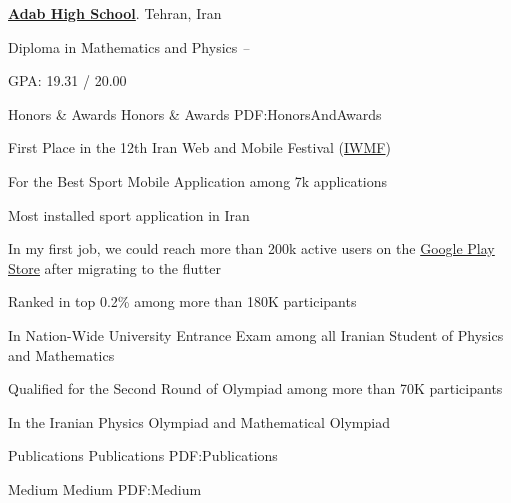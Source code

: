 \documentclass[letterpaper,MMMyyyy,nonstopmode]{resume}
\begin{document}
\begin{Body}
\BigGap
\Entry
\href{http://adab.sch.ir/HSchool}
{\textbf{Adab High School}}.
\small{Tehran, Iran}

\Gap
\BulletItem
Diploma in Mathematics and Physics
\hfill
\textsl{\small{ -- }}
\begin{Detail}
\SubBulletItem
GPA: 19.31 / 20.00
\end{Detail}


\Section
{Honors \&\newline
Awards}
{Honors \& Awards}
{PDF:HonorsAndAwards}

\BulletItem
First Place in the 12th Iran Web and Mobile Festival
(\href{https://iwmf.ir}
{\small{IWMF}}) 
\hfill
\textsl{\small{}}
\begin{Detail}
\Item
For the Best Sport Mobile Application among 7k applications
\end{Detail}

\Gap
\BulletItem
Most installed sport application in Iran
\hfill
\textsl{\small{}}
\begin{Detail}
\Item
In my first job, we could reach more than 200k active users on the
\href{https://play.google.com/store/apps/details?id=com.tarafdari.news}
{Google Play Store} after migrating to the flutter
\end{Detail}

\Gap
\BulletItem
Ranked in top 0.2\% among more than 180K participants
\hfill
\textsl{\small{}}
\begin{Detail}
\Item
In Nation-Wide University Entrance Exam among
all Iranian Student of Physics and Mathematics
\end{Detail}

\Gap
\BulletItem
Qualified for the Second Round of Olympiad
among more than 70K participants
\hfill
\textsl{\small{}}
\begin{Detail}
\Item
In the Iranian Physics Olympiad and Mathematical Olympiad
\end{Detail}


\Section
{Publications}
{Publications}
{PDF:Publications}

\SubSection
{Medium}
{Medium}
{PDF:Medium}

\begingroup
\renewcommand{\MaxNumberedItem}{[88]}


\end{Body}
\end{document}

